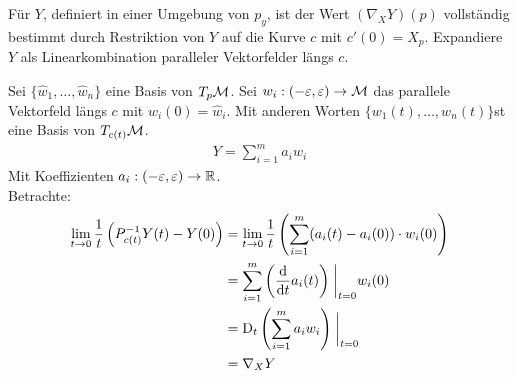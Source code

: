 \begin{bew}
Für $Y$, definiert in einer Umgebung von $p_y$, ist der Wert $(\nabla_X Y)(p)$ vollständig bestimmt durch Restriktion von $Y$ auf die Kurve $c$ mit $c'(0) = X_p$.
Expandiere $Y$ als Linearkombination paralleler Vektorfelder längs $c$.

Sei $\{ \hat{w}_1, \dots, \hat{w}_n \}$ eine Basis von $T_p \mathcal{M}$.
Sei $w_i : (-\varepsilon, \varepsilon) \to \mathcal{M}$ das parallele Vektorfeld längs $c$ mit $w_i(0) = \hat{w}_i$.
Mit anderen Worten  $\{ w_1(t), \dots, w_n (t)\}$st eine Basis von $T_{c(t)}\mathcal{M}$.
\begin{align}
Y = \sum^m_{i=1} a_i w_i
\end{align}
Mit Koeffizienten $a_i: (-\varepsilon , \varepsilon) \to \mathbb{R}$.\\
Betrachte:
\begin{align}
\lim\limits_{t \rightarrow 0} \frac{1}{t} \left( P^{-1}_{c(t)} Y(t) - Y(0)\right) &=  \lim\limits_{t \rightarrow 0} \frac{1}{t} \left( \sum^m_{i=1} (a_i (t) - a_i (0)) \cdot w_i (0) \right)\\
&= \sum^m_{i=1} \left( \dv{t} a_i (t) \right) \eval_{t=0} w_i (0)\\
&= \covd_t \left( \sum^m_{i=1} a_i w_i \right) \eval_{t=0}\\
&= \nabla_X Y
\end{align}
\end{bew}

